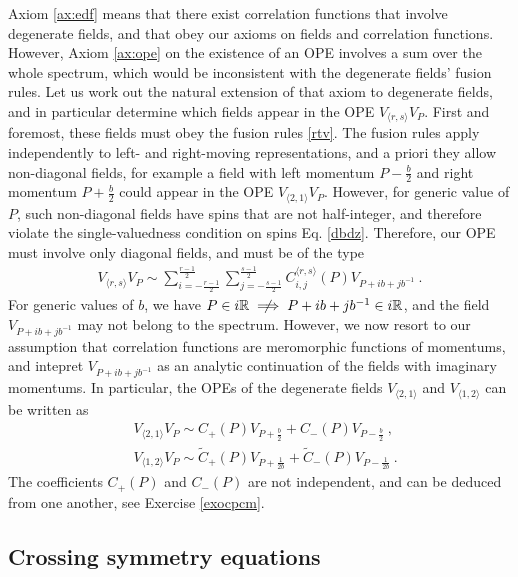 \documentclass[12pt, a4paper, notitlepage, twoside]{report}
\numberwithin{equation}{section}
\theoremstyle{break}
\begin{document}
Axiom \ref{ax:edf} means that there exist correlation functions that involve degenerate fields, and that obey our axioms on fields and correlation functions. However, Axiom \ref{ax:ope} on the existence of an OPE involves a sum over the whole spectrum, which would be inconsistent with the degenerate fields' fusion rules. 
Let us work out the natural extension of that axiom to degenerate fields, and in particular determine which fields appear in the OPE $V_{\langle r,s \rangle} V_P$. First and foremost, these fields must obey the fusion rules
\eqref{rtv}. The fusion rules apply independently to left- and right-moving representations, and  a priori they allow non-diagonal fields, for example a field with left momentum $P-\frac{b}{2}$ and right momentum $P+\frac{b}{2}$ could appear in the OPE $V_{\langle 2,1\rangle} V_P$. However, for generic value of $P$, such non-diagonal fields have spins that are not half-integer, and therefore violate the single-valuedness condition on spins Eq. \eqref{dbdz}.
Therefore, our OPE must involve only diagonal fields, and must be of the type
\begin{align}
 \boxed{V_{\langle r,s \rangle} V_P \sim \sum_{i=-\frac{r-1}{2}}^{\frac{r-1}{2}} \sum_{j=-\frac{s-1}{2}}^{\frac{s-1}{2}}  C_{i,j}^{\langle r,s \rangle}(P) V_{P + ib+jb^{-1}}}\ .
\label{vrsv}
\end{align}
For generic values of $b$, we have $P\in i\mathbb{R} \centernot\implies P+ib+jb^{-1}\in i\mathbb{R}$, and the field $ V_{P + ib+jb^{-1}}$ may not belong to the spectrum. However, we now resort to our assumption that correlation functions are meromorphic functions of momentums, and intepret $ V_{P + ib+jb^{-1}}$ as an analytic continuation of the fields with imaginary momentums.
In particular, the OPEs of the degenerate fields $V_{\langle 2,1\rangle}$ and $V_{\langle 1,2\rangle}$ can be written as 
\begin{align}
 &\boxed{V_{\langle 2,1 \rangle} V_P \sim C_+(P) V_{P+\frac{b}{2}} + C_-(P) V_{P-\frac{b}{2}}}\ ,
\label{vot}
\\
& \boxed{V_{\langle 1,2 \rangle} V_P \sim \tilde{C}_+(P) V_{P+\frac{1}{2b}} + \tilde{C}_-(P) V_{P-\frac{1}{2b}}}\ .
 \label{vto}
\end{align}
The coefficients $C_+(P)$ and $C_-(P)$ are not independent, and can be deduced from one another, see Exercise \ref{exocpcm}.


\subsection{Crossing symmetry equations \label{seccbe}}
\end{document}
